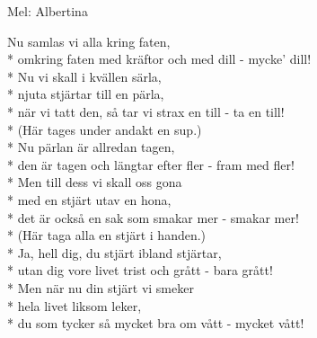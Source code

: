 \begin{SongText}
    \begin{SongInfo}
        Mel: Albertina
    \end{SongInfo}
    \begin{SongVerse}
        Nu samlas vi alla kring faten,\\*%
        omkring faten med kräftor och med dill - mycke’ dill!\\*%
        Nu vi skall i kvällen särla,\\*%
        njuta stjärtar till en pärla,\\*%
        när vi tatt den, så tar vi strax en till - ta en till!\\*%
        (Här tages under andakt en sup.)\\*%
        Nu pärlan är allredan tagen,\\*%
        den är tagen och längtar efter fler - fram med fler!\\*%
        Men till dess vi skall oss gona\\*%
        med en stjärt utav en hona,\\*%
        det är också en sak som smakar mer - smakar mer!\\*%
        (Här taga alla en stjärt i handen.)\\*%
        Ja, hell dig, du stjärt ibland stjärtar,\\*%
        utan dig vore livet trist och grått - bara grått!\\*%
        Men när nu din stjärt vi smeker\\*%
        hela livet liksom leker,\\*%
        du som tycker så mycket bra om vått - mycket vått!
    \end{SongVerse}
\end{SongText}
